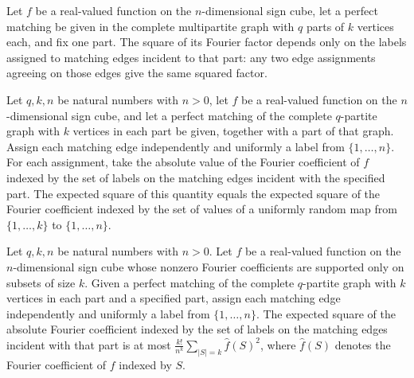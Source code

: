 \begin{theorem}
\label{FABL.graphMatchingEdgeFourierFactor_sq_dependsOn}
\leanok
{}
Let $f$ be a real-valued function on the $n$-dimensional sign cube, let a perfect
matching be given in the complete multipartite graph with $q$ parts of $k$ vertices
each, and fix one part. The square of its Fourier factor depends only on the labels
assigned to matching edges incident to that part: any two edge assignments agreeing on
those edges give the same squared factor.
\end{theorem}

\begin{theorem}
\label{FABL.expect_graphMatchingEdgeFourierFactor_sq_eq}
\leanok
{}
Let $q,k,n$ be natural numbers with $n>0$, let $f$ be a real-valued function on the
$n$-dimensional sign cube, and let a perfect matching of the complete $q$-partite graph
with $k$ vertices in each part be given, together with a part of that graph. Assign each
matching edge independently and uniformly a label from $\{1,\ldots,n\}$. For each
assignment, take the absolute value of the Fourier coefficient of $f$ indexed by the set
of labels on the matching edges incident with the specified part. The expected square of
this quantity equals the expected square of the Fourier coefficient indexed by the set
of values of a uniformly random map from $\{1,\ldots,k\}$ to $\{1,\ldots,n\}$.
\end{theorem}

\begin{theorem}
\label{FABL.expect_graphMatchingEdgeFourierFactor_sq_le}
\leanok
{}
Let $q,k,n$ be natural numbers with $n>0$. Let $f$ be a real-valued function on the
$n$-dimensional sign cube whose nonzero Fourier coefficients are supported only on
subsets of size $k$. Given a perfect matching of the complete $q$-partite graph with $k$
vertices in each part and a specified part, assign each matching edge independently and
uniformly a label from $\{1,\ldots,n\}$. The expected square of the absolute Fourier
coefficient indexed by the set of labels on the matching edges incident with that part
is at most $\frac{k!}{n^k}\sum_{|S|=k}\widehat f(S)^2$, where $\widehat f(S)$
denotes the Fourier coefficient of $f$ indexed by $S$.
\end{theorem}

